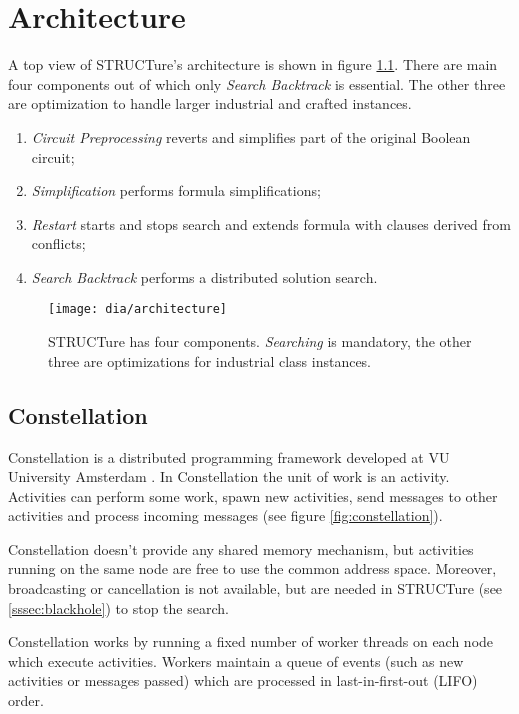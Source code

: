 \chapter{Architecture}

A top view of STRUCTure's architecture is shown in figure
\ref{fig:architecture}. There are main four components
out of which only \emph{Search Backtrack} is essential.
The other three are optimization to handle larger
industrial and crafted instances.
\begin{enumerate}
  \item \emph{Circuit Preprocessing} reverts and simplifies 
  part of the original Boolean circuit;
  \item \emph{Simplification} performs formula simplifications;
  \item \emph{Restart} starts and stops search and extends
  formula with clauses derived from conflicts;
  \item \emph{Search Backtrack} performs a distributed solution search.
\end{enumerate}

\begin{figure}
  \centering
  \texttt{[image: dia/architecture]}
  \caption{STRUCTure has four components. \emph{Searching}
  is mandatory, the other three are optimizations
  for industrial class instances.}
  \label{fig:architecture}
\end{figure}


\section{Constellation}

Constellation is a distributed programming framework developed at VU University
Amsterdam \cite{mine:constellation}. In Constellation the unit of work is
an activity. Activities can perform some work, spawn new activities,
send messages to other activities and process incoming messages
(see figure \ref{fig:constellation}).

Constellation doesn't provide any shared memory mechanism, but
activities running on the same node are free to use the common
address space. Moreover, broadcasting or cancellation is not
available, but are needed in STRUCTure (see \ref{sssec:blackhole})
to stop the search.

Constellation works by running a fixed number of worker threads
on each node which execute activities.  Workers maintain a
queue of events (such as new activities or messages passed) which are
processed in last-in-first-out (LIFO) order.


